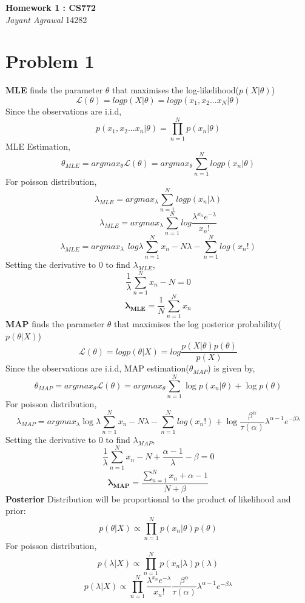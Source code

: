 \documentclass{article}
\begin{document}

\begin{center}
\textbf{\huge Homework 1 : CS772} \\
\vspace{5pt}
\textit{\Large Jayant Agrawal}         14282
\end{center}

\section*{Problem 1}
\textbf{MLE} finds the parameter $\theta$ that maximises the log-likelihood($p(X|\theta)$)
$$\mathcal{L}(\theta) = log p(X|\theta) = log p(x_1, x_2 ...x_N | \theta)$$
Since the observations are i.i.d,
$$ p(x_1, x_2 ...x_n | \theta) = \prod_{n=1}^N p(x_n| \theta)$$
MLE Estimation,
$$\theta_{MLE} = argmax_{\theta} \mathcal{L}(\theta) = argmax_{\theta} \sum_{n=1}^N logp(x_n|\theta)$$
For poisson distribution,
$$\lambda_{MLE} = argmax_{\lambda} \sum_{n=1}^N logp(x_n|\lambda)$$
$$\lambda_{MLE} = argmax_{\lambda} \sum_{n=1}^N log\frac{\lambda^{x_n}e^{-\lambda}}{x_n!}$$
$$\lambda_{MLE} = argmax_{\lambda} \hspace{5pt} log\lambda\sum_{n=1}^Nx_n - N\lambda - \sum_{n=1}^Nlog(x_n!)$$
Setting the derivative to 0 to find $\lambda_{MLE}$,
$$\frac{1}{\lambda}\sum_{n=1}^Nx_n - N = 0$$
$$\mathbf{\lambda_{MLE}} = \frac{1}{N}\sum_{n=1}^Nx_n$$
\textbf{MAP} finds the parameter $\theta$ that maximises the log posterior probability($p(\theta|X)$)
$$\mathcal{L}(\theta) = log p(\theta|X) = log\frac{p(X|\theta)p(\theta)}{p(X)} $$
Since the observations are i.i.d, MAP estimation($\theta_{MAP}$) is given by,
$$\theta_{MAP} = argmax_{\theta} \mathcal{L}(\theta) = argmax_{\theta}\sum_{n=1}^N\log{p(x_n|\theta)}+ \log{p(\theta)} $$
For poisson distribution,
$$\lambda_{MAP} = argmax_{\lambda} \log{\lambda}\sum_{n=1}^Nx_n- N\lambda - \sum_{n=1}^Nlog(x_n!) + \log{\frac{\beta^\alpha}{\tau(\alpha)} \lambda^{\alpha-1} e^{-\beta\lambda}}$$
Setting the derivative to 0 to find $\lambda_{MAP}$,
$$\frac{1}{\lambda}\sum_{n=1}^Nx_n - N + \frac{\alpha-1}{\lambda}- \beta= 0$$
$$\mathbf{\lambda_{MAP}} = \frac{\sum_{n=1}^Nx_n + \alpha-1}{N+\beta}$$
\textbf{Posterior} Distribution will be proportional to the product of likelihood and prior:
$$ p(\theta| X) \propto \prod_{n=1}^N p(x_n|\theta) p(\theta) $$
For poisson distribution,
$$p(\lambda|X) \propto \prod_{n=1}^N p(x_n|\lambda) p(\lambda)$$
$$p(\lambda|X) \propto \prod_{n=1}^N \frac{\lambda^{x_n}e^{-\lambda}}{x_n!} \frac{\beta^\alpha}{\tau(\alpha)} \lambda^{\alpha-1}e^{-\beta \lambda}$$
\end{document}
